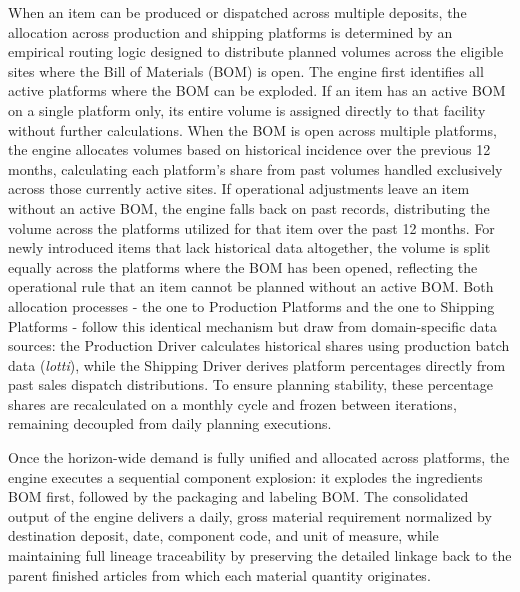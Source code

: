 When an item can be produced or dispatched across multiple deposits, the allocation across production and shipping platforms is determined by an 
empirical routing logic designed to distribute planned volumes across the eligible sites where the Bill of Materials (BOM) is open. 
The engine first identifies all active platforms where the BOM can be exploded. If an item has an active BOM on a single platform only, 
its entire volume is assigned directly to that facility without further calculations.
When the BOM is open across multiple platforms, the engine allocates volumes based on historical incidence over the previous 12 months, 
calculating each platform's share from past volumes handled exclusively across those currently active sites. 
If operational adjustments leave an item without an active BOM, the engine falls back on past records, distributing the volume across the platforms utilized 
for that item over the past 12 months. 
For newly introduced items that lack historical data altogether, the volume is split equally across the platforms where the BOM has been opened, 
reflecting the operational rule that an item cannot be planned without an active BOM.
Both allocation processes - the one to Production Platforms and the one to Shipping Platforms - follow this identical mechanism but draw from 
domain-specific data sources: the Production Driver calculates historical shares using production batch data (\textit{lotti}), 
while the Shipping Driver derives platform percentages directly from past sales dispatch distributions. 
To ensure planning stability, these percentage shares are recalculated on a monthly cycle and frozen between iterations, remaining decoupled from daily planning executions.

Once the horizon-wide demand is fully unified and allocated across platforms, the engine executes a sequential component explosion: 
it explodes the ingredients BOM first, followed by the packaging and labeling BOM. 
The consolidated output of the engine delivers a daily, gross material requirement normalized by destination deposit, date, component code, and unit of measure, 
while maintaining full lineage traceability by preserving the detailed linkage back to the parent finished articles from which each material quantity originates. 